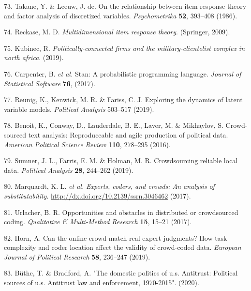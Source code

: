 \documentclass[]{article}
\begin{document}
\begin{cslreferences}
\leavevmode\hypertarget{ref-takane1986}{}%
73. Takane, Y. \& Leeuw, J. de. On the relationship between item response theory and factor analysis of discretized variables. \emph{Psychometrika} \textbf{52}, 393--408 (1986).

\leavevmode\hypertarget{ref-reckase2009}{}%
74. Reckase, M. D. \emph{Multidimensional item response theory}. (Springer, 2009).

\leavevmode\hypertarget{ref-kubinec2019}{}%
75. Kubinec, R. \emph{Politically-connected firms and the military-clientelist complex in north africa}. (2019).

\leavevmode\hypertarget{ref-carpenter2017}{}%
76. Carpenter, B. \emph{et al.} Stan: A probabilistic programming language. \emph{Journal of Statistical Software} \textbf{76}, (2017).

\leavevmode\hypertarget{ref-reunig2019}{}%
77. Reunig, K., Kenwick, M. R. \& Fariss, C. J. Exploring the dynamics of latent variable models. \emph{Political Analysis} 503--517 (2019).

\leavevmode\hypertarget{ref-benoitetal2016}{}%
78. Benoit, K., Conway, D., Lauderdale, B. E., Laver, M. \& Mikhaylov, S. Crowd-sourced text analysis: Reproduceable and agile production of political data. \emph{American Political Science Review} \textbf{110}, 278--295 (2016).

\leavevmode\hypertarget{ref-sumneretal2019}{}%
79. Sumner, J. L., Farris, E. M. \& Holman, M. R. Crowdsourcing reliable local data. \emph{Political Analysis} \textbf{28}, 244--262 (2019).

\leavevmode\hypertarget{ref-marquardtetal2017}{}%
80. Marquardt, K. L. \emph{et al.} \emph{Experts, coders, and crowds: An analysis of substitutability}. \url{http://dx.doi.org/10.2139/ssrn.3046462} (2017).

\leavevmode\hypertarget{ref-Urlacher2017}{}%
81. Urlacher, B. R. Opportunities and obstacles in distributed or crowdsourced coding. \emph{Qualitative \& Multi-Method Research} \textbf{15}, 15--21 (2017).

\leavevmode\hypertarget{ref-Horn2019}{}%
82. Horn, A. Can the online crowd match real expert judgments? How task complexity and coder location affect the validity of crowd-coded data. \emph{European Journal of Political Research} \textbf{58}, 236--247 (2019).

\leavevmode\hypertarget{ref-buthe2020}{}%
83. Büthe, T. \& Bradford, A. "The domestic politics of u.s. Antitrust: Political sources of u.s. Antitrust law and enforcement, 1970-2015". (2020).


\end{cslreferences}
\end{document}
